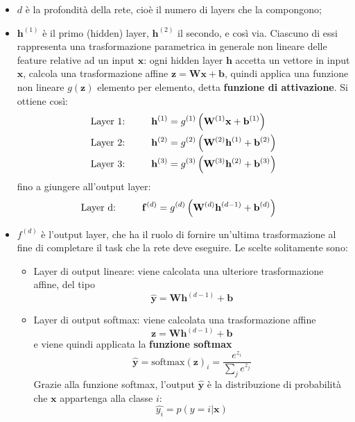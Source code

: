 \begin{itemize}
\item $d$ è la profondità della rete, cioè il numero di layers che la compongono;
\item $\mathbf{h}^{(1)}$ è il primo (hidden) layer, $\mathbf{h}^{(2)}$ il secondo, e così via. Ciascuno di essi rappresenta una trasformazione parametrica in generale non lineare delle feature relative ad un input $\mathbf{x}$: ogni hidden layer $\mathbf{h}$ accetta un vettore in input $\mathbf{x}$, calcola una
trasformazione affine $\mathbf{z}=\mathbf{W}\mathbf{x}+\mathbf{b}$, quindi applica una funzione non lineare $g(\mathbf{z})$
elemento per elemento, detta \textbf{funzione di attivazione}. Si ottiene così:
\begin{align*}
\text{Layer 1: } & \hspace{8mm}\mathbf{h}^{(1)}=g^{(1)}\left(\mathbf{W}^{(1)}\mathbf{x}+\mathbf{b}^{(1)}\right)\\
\text{Layer 2: } & \hspace{8mm}\mathbf{h}^{(2)}=g^{(2)}\left(\mathbf{W}^{(2)}\mathbf{h}^{(1)}+\mathbf{b}^{(2)}\right)\\
\text{Layer 3: } & \hspace{8mm}\mathbf{h}^{(3)}=g^{(3)}\left(\mathbf{W}^{(3)}\mathbf{h}^{(2)}+\mathbf{b}^{(3)}\right)
\end{align*}
fino a giungere all'output layer:
\begin{align*}
\text{Layer d: } & \hspace{8mm}\mathbf{f}^{(d)}=g^{(d)}\left(\mathbf{W}^{(d)}\mathbf{h}^{(d-1)}+\mathbf{b}^{(d)}\right)
\end{align*}
\item $f^{(d)}$ è l'output layer, che ha il ruolo di fornire un'ultima trasformazione al fine di completare il task che la rete deve eseguire. Le scelte solitamente sono:
\begin{itemize}
\item Layer di output lineare: viene calcolata una ulteriore trasformazione affine, del tipo
\begin{equation*}
\mathbf{\widehat{y}}=\mathbf{W}\mathbf{h}^{(d-1)}+\mathbf{b}
\end{equation*}
\item Layer di output softmax: viene calcolata una trasformazione affine
\begin{equation*}
\mathbf{z}=\mathbf{W}\mathbf{h}^{(d-1)}+\mathbf{b}
\end{equation*}
e viene quindi applicata la \textbf{funzione softmax}
\begin{equation*}
\mathbf{\widehat{y}}=\text{softmax}(\mathbf{z})_i=\frac{e^{z_i}}{\sum\nolimits_{j}e^{z_j}}
\end{equation*}
Grazie alla funzione softmax, l'output $\mathbf{\widehat{y}}$ è la distribuzione di probabilità che $\mathbf{x}$ appartenga alla classe $i$:
\begin{equation*}
\widehat{y_i}=p(y=i|\mathbf{x})
\end{equation*}
\end{itemize}
\end{itemize}

